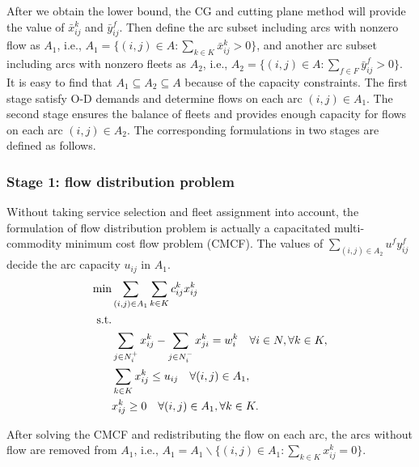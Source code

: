 \documentclass[11pt,nonblindrev,fleqn]{article}
\begin{document}
After we obtain the lower bound, the CG and cutting plane method will provide the value of $\bar{x}_{ij}^k$ and $\bar{y}_{ij}^f$. Then define the arc subset including arcs with nonzero flow as $A_1$, i.e., $A_1 = \{ (i,j)\in A : \sum_{k\in K} \bar{x}_{ij}^k >0 \} $, and another arc subset including arcs with nonzero fleets as $A_2$, i.e., $A_2 =\{  (i,j)\in A : \sum_{f\in F} \bar{y}_{ij}^f >0 \}$. It is easy to find that $A_1\subseteq A_2 \subseteq A$ because of the capacity constraints. The first stage satisfy O-D demands and determine flows on each arc $(i,j)\in A_1$. The second stage ensures the balance of fleets and provides enough capacity for flows on each arc $(i,j)\in A_2$. The corresponding formulations in two stages are defined as follows.

\subsubsection{Stage 1: flow distribution problem}
Without taking service selection and fleet assignment into account, the formulation of flow distribution problem is actually a capacitated multi-commodity minimum cost flow problem (CMCF). The values of $\sum_{(i,j)\in A_2}u^f y_{ij}^f $ decide the arc capacity $u_{ij}$ in $A_1$.
\begin{align}
   \min& \sum_{(i,j)\in A_1}\sum_{k\in K} c_{ij}^k x_{ij}^k     \\
   \rm{s.t.} & \nonumber \\
         &  \sum_{j\in N_i^+}x_{ij}^k - \sum_{j\in N_i^-}x_{ji}^k = w_i^k     \quad      \forall i\in N, \forall k\in K,  \\
         &  \sum_{k\in K} x_{ij}^k \leq u_{ij}      \quad    \forall (i,j)\in A_1,  \\
        &  x_{ij}^k \geq 0   \quad    \forall (i,j)\in A_1, \forall k\in K.
\end{align}

After solving the CMCF and redistributing the flow on each arc, the arcs without flow are removed from $A_1$, i.e., $A_1 = A_1 \backslash  \{ (i,j)\in A_1 : \sum_{k\in K} x_{ij}^k =0 \}$.
\end{document}
